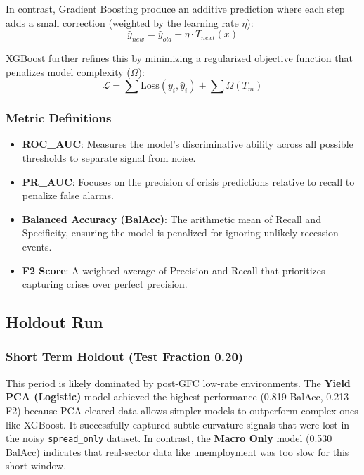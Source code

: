 In contrast, Gradient Boosting produce an additive prediction where each step adds a small correction (weighted by the learning rate $\eta$):
\begin{equation}
\hat{y}_{new} = \hat{y}_{old} + \eta \cdot T_{next}(x)
\end{equation}


XGBoost further refines this by minimizing a regularized objective function that penalizes model complexity ($\Omega$):
\begin{equation}
\mathcal{L} = \sum \text{Loss}(y_i, \hat{y}_i) + \sum \Omega(T_m)
\end{equation}

\subsubsection{Metric Definitions}
\begin{itemize}
    \item \textbf{ROC\_AUC}: Measures the model's discriminative ability across all possible thresholds to separate signal from noise.
    \item \textbf{PR\_AUC}: Focuses on the precision of crisis predictions relative to recall to penalize false alarms.
    \item \textbf{Balanced Accuracy (BalAcc)}: The arithmetic mean of Recall and Specificity, ensuring the model is penalized for ignoring unlikely recession events.
    \item \textbf{F2 Score}: A weighted average of Precision and Recall that prioritizes capturing crises over perfect precision.
\end{itemize}

\subsection{Holdout Run}
\subsubsection{Short Term Holdout (Test Fraction 0.20)}
This period is likely dominated by post-GFC low-rate environments. The \textbf{Yield PCA (Logistic)} model achieved the highest performance (0.819 BalAcc, 0.213 F2) because PCA-cleared data allows simpler models to outperform complex ones like XGBoost. It successfully captured subtle curvature signals that were lost in the noisy \texttt{spread\_only} dataset. In contrast, the \textbf{Macro Only} model (0.530 BalAcc) indicates that real-sector data like unemployment was too slow for this short window.

